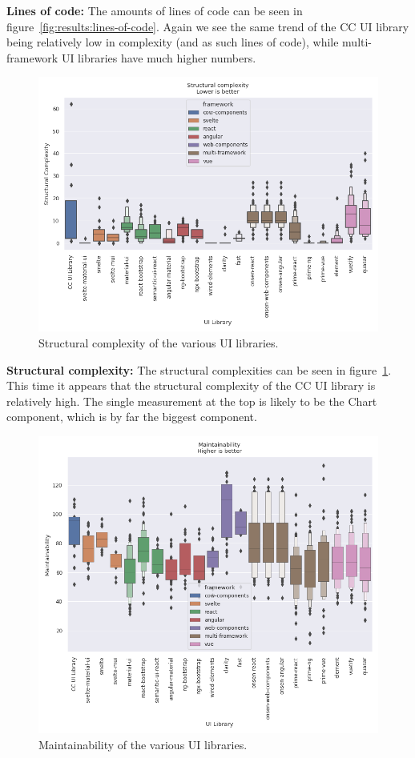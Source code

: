 \textbf{Lines of code:} The amounts of lines of code can be seen in figure~\ref{fig:results:lines-of-code}. Again we see the same trend of the CC UI library being relatively low in complexity (and as such lines of code), while multi-framework UI libraries have much higher numbers.

\begin{figure}[h]
  \includegraphics[width=\columnwidth]{plots/structural-complexity.png}
  \caption{Structural complexity of the various UI libraries.}
  \label{fig:results:structural-complexity}
  \centering
\end{figure}

\textbf{Structural complexity:} The structural complexities can be seen in figure~\ref{fig:results:structural-complexity}. This time it appears that the structural complexity of the CC UI library is relatively high. The single measurement at the top is likely to be the Chart component, which is by far the biggest component.

\begin{figure}[h]
  \includegraphics[width=\columnwidth]{plots/maintainability.png}
  \caption{Maintainability of the various UI libraries.}
  \label{fig:results:maintainabilty}
  \centering
\end{figure}

